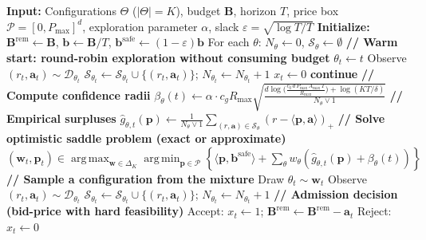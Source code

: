 \documentclass[11pt]{article}
\newcommand{\bB}{\mathbf{B}}
\newcommand{\bb}{\mathbf{b}}
\newcommand{\bbS}{\mathbf{b}^{\mathrm{safe}}}
\newcommand{\ba}{\mathbf{a}}
\newcommand{\bp}{\mathbf{p}}
\newcommand{\bw}{\mathbf{w}}
\newcommand{\cP}{\mathcal{P}}
\newcommand{\cD}{\mathcal{D}}
\newcommand{\cS}{\mathcal{S}}
\DeclareMathOperator*{\argmax}{arg\,max}
\DeclareMathOperator*{\argmin}{arg\,min}
\begin{document}
\begin{algorithm}[H]
\caption{SP-UCB-OLP: Optimistic Saddle + Mixture Sampling + Bid-Price Admission}
\begin{algorithmic}[1]
\STATE \textbf{Input:} Configurations $\Theta$ ($|\Theta| = K$), budget $\bB$, horizon $T$, price box $\cP = [0, P_{\max}]^d$, exploration parameter $\alpha$, slack $\varepsilon = \sqrt{\log T / T}$
\STATE \textbf{Initialize:} $\bB^{\mathrm{rem}} \gets \bB$, $\bb \gets \bB/T$, $\bbS \gets (1-\varepsilon)\bb$
\STATE For each $\theta$: $N_\theta \gets 0$, $\cS_\theta \gets \emptyset$
    \STATE \textbf{// Warm start: round-robin exploration without consuming budget}
        \STATE $\theta_t \gets t$ 
        \STATE Observe $(r_t, \ba_t) \sim \cD_{\theta_t}$
        \STATE $\cS_{\theta_t} \gets \cS_{\theta_t} \cup \{(r_t, \ba_t)\}$; \quad $N_{\theta_t} \gets N_{\theta_t} + 1$
        \STATE $x_t \gets 0$ 
        \STATE \textbf{continue}
    \ENDIF
    \STATE \textbf{// Compute confidence radii}
        \STATE $\beta_\theta(t) \gets \alpha \cdot c_g R_{\max} \sqrt{\frac{d \log\!\Big(\frac{c_0\,d\,P_{\max}\,A_{\max}\,T}{R_{\max}}\Big) + \log(KT/\delta)}{N_\theta \vee 1}}$
    \ENDFOR
    \STATE \textbf{// Empirical surpluses}
    \STATE $\widehat{g}_{\theta,t}(\bp) \gets \frac{1}{N_\theta \vee 1} \sum_{(r,\ba) \in \cS_\theta} (r - \langle \bp, \ba \rangle)_+$
    \STATE \textbf{// Solve optimistic saddle problem (exact or approximate)}
    \STATE $(\bw_t, \bp_t) \in \argmax_{\bw \in \Delta_K} \argmin_{\bp \in \cP} \left\{ \langle \bp, \bbS \rangle + \sum_\theta w_\theta (\widehat{g}_{\theta,t}(\bp) + \beta_\theta(t)) \right\}$
    \STATE \textbf{// Sample a configuration from the mixture}
    \STATE Draw $\theta_t \sim \bw_t$
    \STATE Observe $(r_t, \ba_t) \sim \cD_{\theta_t}$
    \STATE $\cS_{\theta_t} \gets \cS_{\theta_t} \cup \{(r_t, \ba_t)\}$; \quad $N_{\theta_t} \gets N_{\theta_t} + 1$
    \STATE \textbf{// Admission decision (bid-price with hard feasibility)}
    \IF{$\ba_t \le \bB^{\mathrm{rem}}$ \AND $r_t \ge \langle \bp_t, \ba_t \rangle$}
        \STATE Accept: $x_t \gets 1$; \quad $\bB^{\mathrm{rem}} \gets \bB^{\mathrm{rem}} - \ba_t$
    \ELSE
        \STATE Reject: $x_t \gets 0$
    \ENDIF
\ENDFOR
\end{algorithmic}
\end{algorithm}
\end{document}
